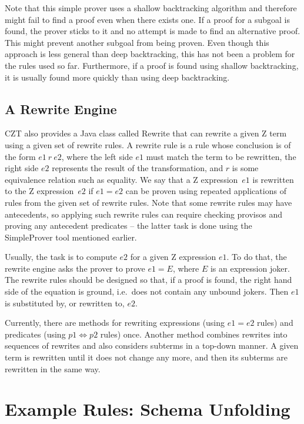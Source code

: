 \documentclass{entcs}
\begin{document}
Note that this simple prover uses a shallow backtracking algorithm and
therefore might fail to find a proof even when there exists one.  If a
proof for a subgoal is found, the prover sticks to it and no attempt
is made to find an alternative proof.  This might prevent another
subgoal from being proven.  Even though this approach is less general
than deep backtracking, this has not been a problem for the rules used
so far.  Furthermore, if a proof is found using shallow backtracking,
it is usually found more quickly than using deep backtracking.

\subsection{A Rewrite Engine} \label{sec:rewrite}

CZT also provides a Java class called Rewrite that can rewrite a given
Z term using a given set of rewrite rules.  A rewrite rule is a rule
whose conclusion is of the form $e1~r~e2$, where the left side $e1$
must match the term to be rewritten, the right side $e2$ represents
the result of the transformation, and $r$ is some equivalence relation
such as equality.  We say that a Z expression~$e1$ is rewritten to the
Z expression~$e2$ if $e1 = e2$ can be proven using repeated
applications of rules from the given set of rewrite rules.  Note that
some rewrite rules may have antecedents, so applying such rewrite
rules can require checking provisos and proving any antecedent
predicates -- the latter task is done using the SimpleProver tool
mentioned earlier.

Usually, the task is to compute $e2$ for a given Z expression $e1$.
To do that, the rewrite engine asks the prover to prove $e1 = E$,
where $E$ is an expression joker.  The rewrite rules should be
designed so that, if a proof is found, the right hand side of the
equation is ground, i.e.\ does not contain any unbound jokers.  Then
$e1$ is substituted by, or rewritten to, $e2$.

Currently, there are methods for rewriting expressions (using $e1 =
e2$ rules) and predicates (using $p1 \iff p2$ rules) once.
Another method combines rewrites into sequences of rewrites and also
considers subterms in a top-down manner.  A given term is rewritten
until it does not change any more, and then its subterms are rewritten
in the same way.


\section{Example Rules: Schema Unfolding} \label{sec:schemas}
\end{document}
